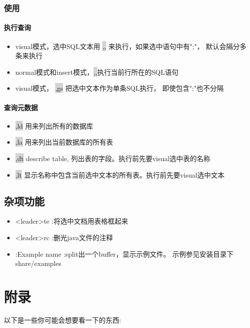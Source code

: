 \documentclass[oneside,openany]{book}
\begin{document}
\subsection{使用}

\subsubsection{执行查询}

    \begin{itemize} 
      \item  visual模式，选中SQL文本用 \colorbox{lightgray}{,,} 来执行，如果选中语句中有";"， 默认会隔分多条来执行
      \item  normal模式和insert模式，\colorbox{lightgray}{,,}执行当前行所在的SQL语句
      \item  visual模式， \colorbox{lightgray}{,gs} 把选中文本作为单条SQL执行， 即使包含";"也不分隔
    \end{itemize} 

\subsubsection{查询元数据}

    \begin{itemize} 
    \item \colorbox{lightgray}{,ld} 用来列出所有的数据库
    \item \colorbox{lightgray}{,la} 用来列出当前数据库的所有表
    \item \colorbox{lightgray}{,dt} describe table, 列出表的字段。执行前先要visual选中表的名称
    \item \colorbox{lightgray}{,lt} 显示名称中包含当前选中文本的所有表。执行前先要visual选中文本
    \end{itemize} 

\section{杂项功能}
  \begin{itemize}
        \item <leader>te  :将选中文档用表格框起来
        \item <leader>rc  :删光java文件的注释
        \item :Example name  :split出一个buffer，显示示例文件。 示例参见安装目录下share/examples
  \end{itemize}
    

\chapter{附录}
  以下是一些你可能会想要看一下的东西:
  \newline
\end{document}
